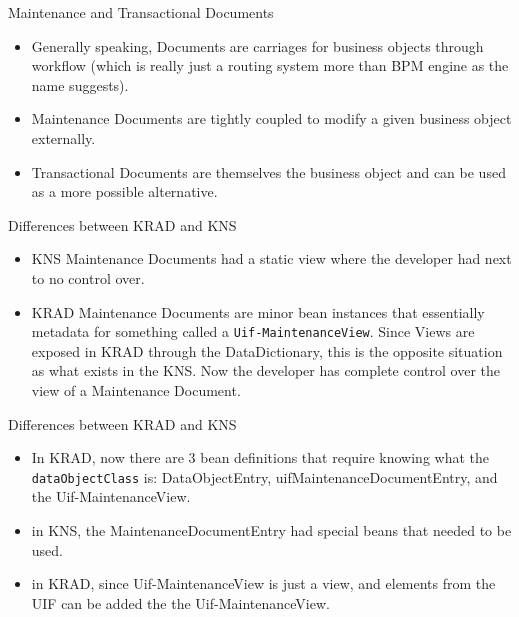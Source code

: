 \documentclass[xcolor=dvipsnames,14pt,professionalfonts]{beamer}
\begin{document}
\begin{frame}{Maintenance and Transactional Documents}
  \begin{itemize}
    \item Generally speaking, Documents are carriages for business
      objects through workflow (which is really just a routing system
      more than BPM engine as the name suggests).
    \item Maintenance Documents are tightly coupled to modify a given
      business object externally.
    \item Transactional Documents are themselves the business object
      and can be used as a more possible alternative.
  \end{itemize}
\end{frame}

\begin{frame}{Differences between KRAD and KNS}
  \begin{itemize}
  \item KNS Maintenance Documents had a static view where the
    developer had next to no control over.
  \item KRAD Maintenance Documents are minor bean instances that
    essentially metadata for something called a
    \texttt{Uif-MaintenanceView}. Since Views are exposed in KRAD
    through the DataDictionary, this is the opposite situation as what
    exists in the KNS. Now the developer has complete control over the
    view of a Maintenance Document.
  \end{itemize}
\end{frame}

\begin{frame}{Differences between KRAD and KNS}
  \begin{itemize}
  \item In KRAD, now there are 3 bean definitions that require knowing
    what the \texttt{dataObjectClass} is: DataObjectEntry,
    uifMaintenanceDocumentEntry, and the Uif-MaintenanceView.
  \item in KNS, the MaintenanceDocumentEntry had special beans that
    needed to be used.
  \item in KRAD, since Uif-MaintenanceView is just a view, and
    elements from the UIF can be added the the Uif-MaintenanceView.
  \end{itemize}
\end{frame}
\end{document}
